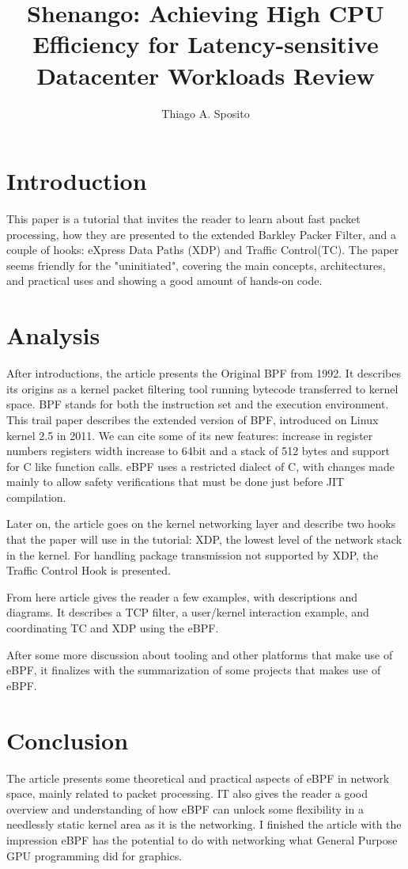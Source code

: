 \documentclass[12pt]{article}
\title{Shenango: Achieving High CPU Efficiency for Latency-sensitive Datacenter Workloads Review}
\author{Thiago A. Sposito\inst{1} }
\begin{document}
 

\maketitle


\section{Introduction}
This paper is a tutorial that invites the reader to learn about fast packet processing, how they are presented to the extended Barkley Packer Filter, and a couple of hooks: eXpress Data Paths (XDP) and Traffic Control(TC). The paper seems friendly for the "uninitiated", covering the main concepts, architectures, and practical uses and showing a good amount of hands-on code. \cite{vieira2020fast}
\section{Analysis}
After introductions, the article presents the Original BPF from 1992. It describes its origins as a kernel packet filtering tool running bytecode transferred to kernel space. BPF stands for both the instruction set and the execution environment.
This trail paper describes the extended version of BPF, introduced on Linux kernel 2.5 in 2011. We can cite some of its new features: increase in register numbers registers width increase to 64bit and a stack of 512 bytes and support for C like function calls. eBPF uses a restricted dialect of C, with changes made mainly to allow safety verifications that must be done just before JIT compilation.

Later on, the article goes on the kernel networking layer and describe two hooks that the paper will use in the tutorial: XDP, the lowest level of the network stack in the kernel. For handling package transmission not supported by XDP, the Traffic Control Hook is presented. 

From here article gives the reader a few examples, with descriptions and diagrams. It describes a TCP filter, a user/kernel interaction example, and coordinating TC and XDP using the eBPF. 

After some more discussion about tooling and other platforms that make use of eBPF, it finalizes with the summarization of some projects that makes use of eBPF.

\section{Conclusion}
The article presents some theoretical and practical aspects of eBPF in network space, mainly related to packet processing. IT also gives the reader a good overview and understanding of how eBPF can unlock some flexibility in a needlessly static kernel area as it is the networking. I finished the article with the impression eBPF has the potential to do with networking what General Purpose GPU programming did for graphics.



\end{document}
